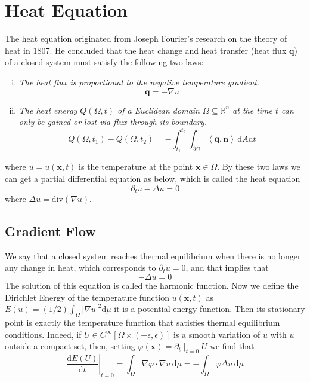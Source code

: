 \section{Heat Equation}

The heat equation originated from Joseph Fourier's research on the theory of heat in 1807. He concluded that the heat change and heat transfer (heat flux $\boldsymbol{q}$) of a closed system must satisfy the following two laws:
\begin{enumerate}[i.]
    \item \textit{The heat flux is
proportional to the negative temperature gradient}.
\begin{equation*}
    \boldsymbol{q}=-\nabla u
\end{equation*}
    \item \textit{The heat energy $Q(\Omega,t)$ of a Euclidean domain $\Omega\subseteq\mathbb{R}^n$ at the time $t$ can only
be gained or lost via flux through its boundary.}
\begin{equation*}
    Q(\Omega,t_1)-Q(\Omega,t_2)=-\int_{t_1}^{t_2}\int_{\partial\Omega}\left<\boldsymbol{q},\boldsymbol{n}\right>\,\mathrm{d}A\mathrm{d}t
\end{equation*}
\end{enumerate}
where $u=u(\boldsymbol{x},t)$ is the temperature at the point $\boldsymbol{x}\in\Omega$. By these two laws we can get a partial differential equation as below, which is called the heat equation
\begin{equation}\label{H-0-1}
    \partial_t u-\Delta u=0
\end{equation}
where $\Delta u=\mathrm{div}(\nabla u)$.

\subsection{Gradient Flow}

We say that a closed system reaches thermal equilibrium when there is no longer any change in heat, which corresponds to $\partial_t u=0$, and that implies that
\begin{equation*}
    -\Delta u=0
\end{equation*}
The solution of this equation is called the harmonic function. Now we define the Dirichlet Energy of the temperature function $u(\boldsymbol{x},t)$ as $E(u)=(1/2)\int_\Omega{\left|\nabla u\right|}^2\mathrm{d}\mu$ it is a potential energy function. Then its stationary point is exactly the temperature function that satisfies thermal equilibrium conditions. Indeed, if $U\in C^\infty[\Omega\times(-\epsilon,\epsilon)]$ is a smooth variation of $u$ with $u$ outside a compact set, then, setting $\varphi(\boldsymbol{x})=\partial_t\mid_{t=0}U$ we find that
\begin{equation*}
    \left.\frac{\mathrm{d}E(U)}{\mathrm{d}t}\right|_{t=0}=\int_{\Omega}\nabla\varphi\cdot\nabla u\, \mathrm{d}\mu=-\int_\Omega\varphi\Delta u\,\mathrm{d}\mu
\end{equation*}


